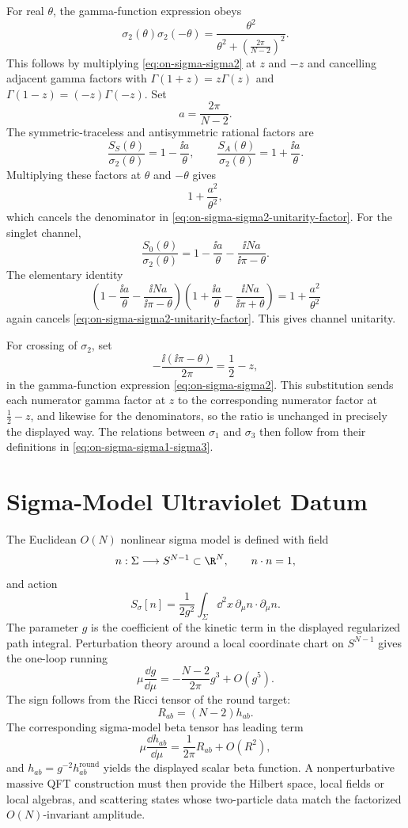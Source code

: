 For real \(\theta\), the gamma-function expression obeys
\begin{equation}
  \sigma_2(\theta)\sigma_2(-\theta)
  =
  \frac{\theta^2}
       {\theta^2+\left(\frac{2\pi}{N-2}\right)^2}.
  \label{eq:on-sigma-sigma2-unitarity-factor}
\end{equation}
This follows by multiplying \eqref{eq:on-sigma-sigma2} at \(z\) and \(-z\)
and cancelling adjacent gamma factors with \(\Gamma(1+z)=z\Gamma(z)\) and
\(\Gamma(1-z)=(-z)\Gamma(-z)\).  Set
\[
  a=\frac{2\pi}{N-2}.
\]
The symmetric-traceless and antisymmetric rational factors are
\[
  \frac{S_S(\theta)}{\sigma_2(\theta)}
  =
  1-\frac{\ii a}{\theta},
  \qquad
  \frac{S_A(\theta)}{\sigma_2(\theta)}
  =
  1+\frac{\ii a}{\theta}.
\]
Multiplying these factors at \(\theta\) and \(-\theta\) gives
\[
  1+\frac{a^2}{\theta^2},
\]
which cancels the denominator in
\eqref{eq:on-sigma-sigma2-unitarity-factor}.  For the singlet channel,
\[
  \frac{S_0(\theta)}{\sigma_2(\theta)}
  =
  1-\frac{\ii a}{\theta}
  -\frac{\ii Na}{\ii\pi-\theta}.
\]
The elementary identity
\[
  \left(
    1-\frac{\ii a}{\theta}
    -\frac{\ii Na}{\ii\pi-\theta}
  \right)
  \left(
    1+\frac{\ii a}{\theta}
    -\frac{\ii Na}{\ii\pi+\theta}
  \right)
  =
  1+\frac{a^2}{\theta^2}
\]
again cancels \eqref{eq:on-sigma-sigma2-unitarity-factor}.  This gives
channel unitarity.

For crossing of \(\sigma_2\), set
\[
  -\frac{\ii(\ii\pi-\theta)}{2\pi}
  =
  \frac12-z,
\]
in the gamma-function expression \eqref{eq:on-sigma-sigma2}.  This
substitution sends each numerator gamma factor at \(z\) to the corresponding
numerator factor at \(\frac12-z\), and likewise for the denominators, so the
ratio is unchanged in precisely the displayed way.  The
relations between \(\sigma_1\) and \(\sigma_3\) then follow from their
definitions in \eqref{eq:on-sigma-sigma1-sigma3}.

\section{Sigma-Model Ultraviolet Datum}

The Euclidean \(O(N)\) nonlinear sigma model is defined with field
\[
  n:\Sigma\longrightarrow S^{N-1}\subset\R^N,\qquad n\cdot n=1,
\]
and action
\[
  S_{\sigma}[n]
  =
  \frac1{2g^2}\int_\Sigma \dd^2x\,\partial_\mu n\cdot\partial_\mu n .
\]
The parameter \(g\) is the coefficient of the kinetic term in the displayed
regularized path integral.  Perturbation theory around a local coordinate
chart on \(S^{N-1}\) gives the one-loop running
\[
  \mu\frac{\dd g}{\dd\mu}
  =
  -\frac{N-2}{2\pi}g^3+O(g^5).
\]
The sign follows from the Ricci tensor of the round target:
\[
  R_{ab}=(N-2)h_{ab}.
\]
The corresponding sigma-model beta tensor has leading term
\[
  \mu\frac{\dd h_{ab}}{\dd\mu}
  =
  \frac1{2\pi}R_{ab}+O(R^2),
\]
and \(h_{ab}=g^{-2}h^{\mathrm{round}}_{ab}\) yields the displayed scalar
beta function.  A nonperturbative massive QFT construction must then provide
the Hilbert space, local fields or local algebras, and scattering states whose
two-particle data match the factorized \(O(N)\)-invariant amplitude.

